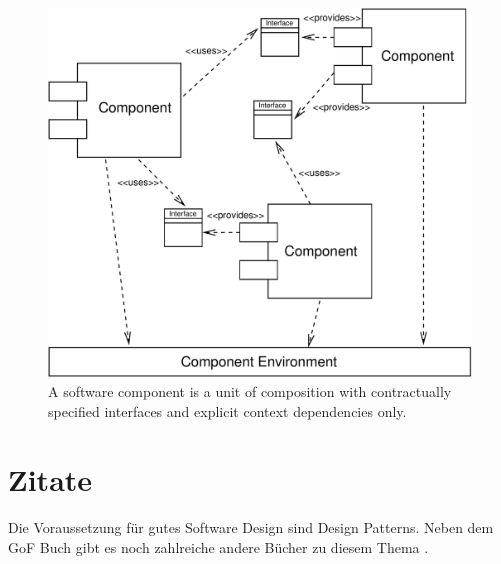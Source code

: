 \begin{appendix}
\begin{figure}[htbp]
    \centering
    \includegraphics [width=12cm,angle=0] {figures/Environment}
    \caption{A software component is a unit of composition with 
        contractually specified interfaces and explicit context 
		dependencies only.}
    \label{ComponentDef}
\end{figure}


\section{Zitate}

Die Voraussetzung für gutes Software Design sind Design Patterns.
Neben dem GoF Buch \cite[S. 190]{Gamma95} gibt es noch zahlreiche andere Bücher
zu diesem Thema \cite[S. 999]{Marinescu02} \cite{dpquiz} \cite{Wick2005}.

\end{appendix}
